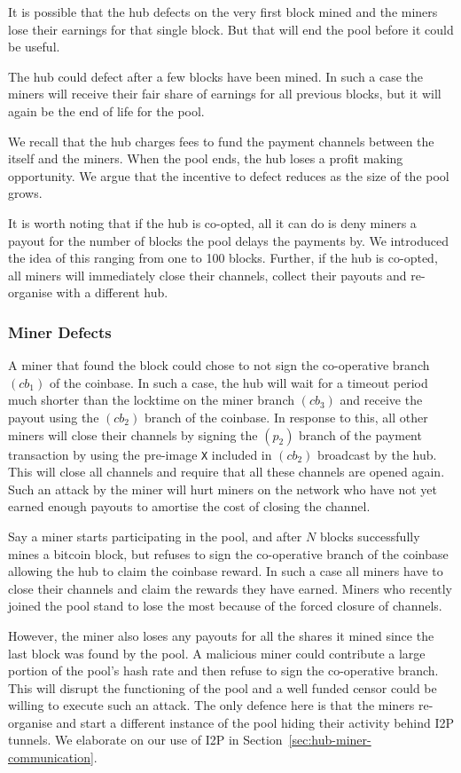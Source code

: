 \documentclass{article}
\begin{document}
It is possible that the hub defects on the very first block mined and
the miners lose their earnings for that single block. But that will
end the pool before it could be useful.

The hub could defect after a few blocks have been mined. In such a
case the miners will receive their fair share of earnings for all
previous blocks, but it will again be the end of life for the pool.

We recall that the hub charges fees to fund the payment channels
between the itself and the miners. When the pool ends, the hub loses a
profit making opportunity. We argue that the incentive to defect
reduces as the size of the pool grows.

It is worth noting that if the hub is co-opted, all it can do is deny
miners a payout for the number of blocks the pool delays the payments
by. We introduced the idea of this ranging from one to 100
blocks. Further, if the hub is co-opted, all miners will immediately
close their channels, collect their payouts and re-organise with a
different hub.

\subsubsection{Miner Defects}\label{ref:miner-defects}

A miner that found the block could chose to not sign the co-operative
branch $(cb_1)$ of the coinbase. In such a case, the hub will wait for
a timeout period much shorter than the locktime on the miner branch
$(cb_3)$ and receive the payout using the $(cb_2)$ branch of the
coinbase. In response to this, all other miners will close their
channels by signing the $(p_2)$ branch of the payment transaction by
using the pre-image \verb|X| included in $(cb_2)$ broadcast by the
hub. This will close all channels and require that all these channels
are opened again. Such an attack by the miner will hurt miners on the
network who have not yet earned enough payouts to amortise the cost of
closing the channel.

Say a miner starts participating in the pool, and after $N$ blocks
successfully mines a bitcoin block, but refuses to sign the
co-operative branch of the coinbase allowing the hub to claim the
coinbase reward. In such a case all miners have to close their
channels and claim the rewards they have earned. Miners who recently
joined the pool stand to lose the most because of the forced closure
of channels.

However, the miner also loses any payouts for all the shares it mined
since the last block was found by the pool. A malicious miner could
contribute a large portion of the pool's hash rate and then refuse to
sign the co-operative branch. This will disrupt the functioning of the
pool and a well funded censor could be willing to execute such an
attack. The only defence here is that the miners re-organise and start
a different instance of the pool hiding their activity behind I2P
tunnels. We elaborate on our use of I2P in
Section~\ref{sec:hub-miner-communication}.
\end{document}
